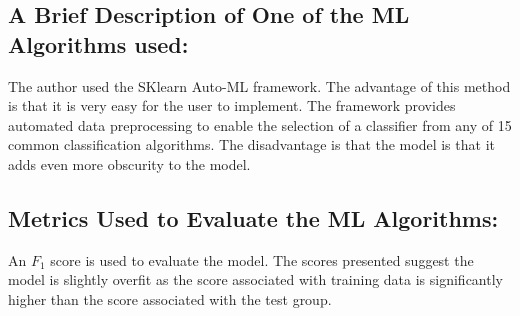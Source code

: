 \documentclass[]{article}
\begin{document}
\subsection*{A Brief Description of One of the ML Algorithms used:}
The author used the SKlearn Auto-ML framework. 
The advantage of this method is that it is very easy for the user to implement.
The framework provides automated data preprocessing to enable the selection of a classifier from any of 15 common classification algorithms.
The disadvantage is that the model is that it adds even more obscurity to the model.


\subsection*{Metrics Used to Evaluate the ML Algorithms:}
An $F_1$ score is used to evaluate the model. 
The scores presented suggest the model is slightly overfit as the score associated with training data is significantly higher than the score associated with the test group.
\end{document}
